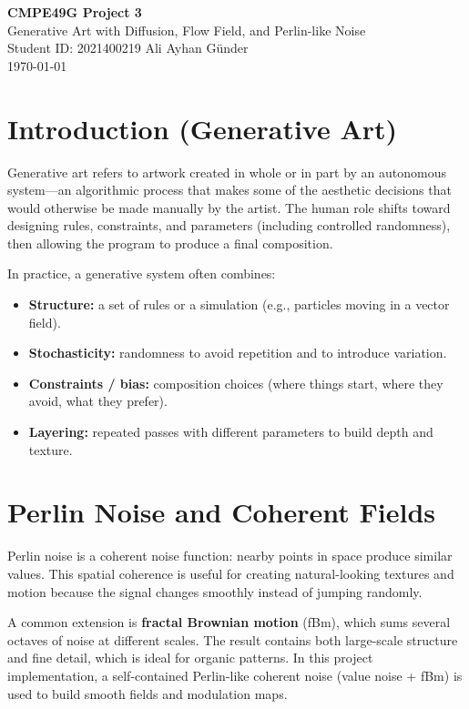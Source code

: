 \documentclass[12pt]{article}
\begin{document}
\begin{center}
	{\LARGE\textbf{CMPE49G Project 3}}\\[6pt]
	{\Large Generative Art with Diffusion, Flow Field, and Perlin-like Noise}\\[10pt]
	{\normalsize Student ID: 2021400219 \quad\textbullet\quad Ali Ayhan Günder}\\[6pt]
	{\normalsize \today}
\end{center}

\section{Introduction (Generative Art)}
Generative art refers to artwork created in whole or in part by an autonomous system---an algorithmic process
that makes some of the aesthetic decisions that would otherwise be made manually by the artist.
The human role shifts toward designing rules, constraints, and parameters (including controlled randomness),
then allowing the program to produce a final composition.

In practice, a generative system often combines:
\begin{itemize}[leftmargin=*,itemsep=2pt]
	\item \textbf{Structure:} a set of rules or a simulation (e.g., particles moving in a vector field).
	\item \textbf{Stochasticity:} randomness to avoid repetition and to introduce variation.
	\item \textbf{Constraints / bias:} composition choices (where things start, where they avoid, what they prefer).
	\item \textbf{Layering:} repeated passes with different parameters to build depth and texture.
\end{itemize}

\section{Perlin Noise and Coherent Fields}
Perlin noise is a coherent noise function: nearby points in space produce similar values.
This spatial coherence is useful for creating natural-looking textures and motion because the signal changes
smoothly instead of jumping randomly.

A common extension is \textbf{fractal Brownian motion} (fBm), which sums several octaves of noise at different
scales. The result contains both large-scale structure and fine detail, which is ideal for organic patterns.
In this project implementation, a self-contained Perlin-like coherent noise (value noise + fBm) is used to build
smooth fields and modulation maps.
\end{document}
